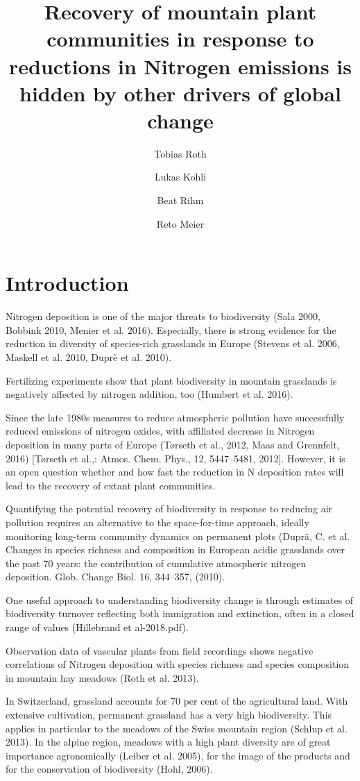 \documentclass[fleqn,10pt,lineno]{wlpeerj} %
\title{Recovery of mountain plant communities in response to reductions in
Nitrogen emissions is hidden by other drivers of global change}
\author[1, 2]{Tobias Roth}
\author[2]{Lukas Kohli}
\author[3]{Beat Rihm}
\author[4]{Reto Meier}
\affil[1]{Zoological Institute, University of Basel, Basel, Switzerland}
\affil[2]{Hintermann Weber AG, Austrasse 2a, 4153 Reinach, Switzerland}
\affil[3]{Meteotest,Fabrikstrasse 14, 3012 Bern, Switzerland}
\affil[4]{Federal Office for the Environment (FOEN), Air Pollution Control and
Chemicals Division, 3003 Bern, Switzerland}
\theoremstyle{definition}
\theoremstyle{definition}
\theoremstyle{definition}
\theoremstyle{remark}
\begin{document}
\flushbottom
\maketitle
\thispagestyle{empty}

\section*{Introduction}\label{introduction}

Nitrogen deposition is one of the major threats to biodiversity (Sala
2000, Bobbink 2010, Menier et al. 2016). Especially, there is strong
evidence for the reduction in diversity of species-rich grasslands in
Europe (Stevens et al. 2006, Maskell et al. 2010, Duprè et al. 2010).

Fertilizing experiments show that plant biodiversity in mountain
grasslands is negatively affected by nitrogen addition, too (Humbert et
al. 2016).

Since the late 1980s measures to reduce atmospheric pollution have
successfully reduced emissions of nitrogen oxides, with affiliated
decrease in Nitrogen deposition in many parts of Europe (Tørseth et al.,
2012, Maas and Grennfelt, 2016) {[}Tørseth et al.,: Atmos. Chem. Phys.,
12, 5447--5481, 2012{]}. However, it is an open question whether and how
fast the reduction in N deposition rates will lead to the recovery of
extant plant communities.

Quantifying the potential recovery of biodiversity in response to
reducing air pollution requires an alternative to the space-for-time
approach, ideally monitoring long-term community dynamics on permanent
plots (Duprã, C. et al. Changes in species richness and composition in
European acidic grasslands over the past 70 years: the contribution of
cumulative atmospheric nitrogen deposition. Glob. Change Biol. 16,
344--357, (2010).

One useful approach to understanding biodiversity change is through
estimates of biodiversity turnover reflecting both immigration and
extinction, often in a closed range of values (Hillebrand et
al-2018.pdf).

Observation data of vascular plants from field recordings shows negative
correlations of Nitrogen deposition with species richness and species
composition in mountain hay meadows (Roth et al. 2013).

In Switzerland, grassland accounts for 70 per cent of the agricultural
land. With extensive cultivation, permanent grassland has a very high
biodiversity. This applies in particular to the meadows of the Swiss
mountain region (Schlup et al. 2013). In the alpine region, meadows with
a high plant diversity are of great importance agronomically (Leiber et
al. 2005), for the image of the products and for the conservation of
biodiversity (Hohl, 2006).
\end{document}
